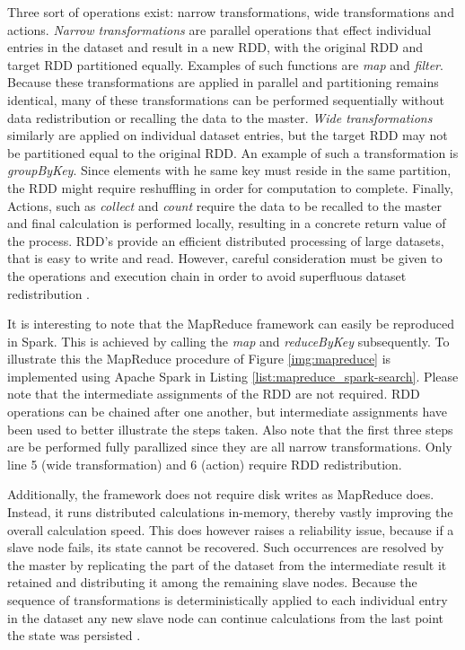 Three sort of operations exist: narrow transformations, wide transformations and actions. \emph{Narrow transformations} are parallel operations that effect individual entries in the dataset and result in a new RDD, with the original RDD and target RDD partitioned equally. Examples of such functions are \emph{map} and \emph{filter}. Because these transformations are applied in parallel and partitioning remains identical, many of these transformations can be performed sequentially without data redistribution or recalling the data to the master. \emph{Wide transformations} similarly are applied on individual dataset entries, but the target RDD may not be partitioned equal to the original RDD. An example of such a transformation is \emph{groupByKey}. Since elements with  he same key must reside in the same partition, the RDD might require reshuffling in order for computation to complete. Finally, Actions, such as \emph{collect} and \emph{count} require the data to be recalled to the master and final calculation is performed locally, resulting in a concrete return value of the process. RDD's provide an efficient distributed processing of large datasets, that is easy to write and read. However, careful consideration must be given to the operations and execution chain in order to avoid superfluous dataset redistribution \cite{spark_programming_guide}.



It is interesting to note that the MapReduce framework can easily be reproduced in Spark. This is achieved by calling the \emph{map} and \emph{reduceByKey} subsequently. To illustrate this the MapReduce procedure of Figure \ref{img:mapreduce} is implemented using Apache Spark in Listing \ref{list:mapreduce_spark-search}. Please note that the intermediate assignments of the RDD are not required. RDD operations can be chained after one another, but intermediate assignments have been used to better illustrate the steps taken. Also note that the first three steps are be performed fully parallized since they are all narrow transformations. Only line 5 (wide transformation) and 6 (action) require RDD redistribution.

Additionally, the framework does not require disk writes as MapReduce does. Instead, it runs distributed calculations in-memory, thereby vastly improving the overall calculation speed. This does however raises a reliability issue, because if a slave node fails, its state cannot be recovered. Such occurrences are resolved by the master by replicating the part of the dataset from the intermediate result it retained and distributing it among the remaining slave nodes. Because the sequence of transformations is deterministically applied to each individual entry in the dataset any new slave node can continue calculations from the last point the state was persisted \cite{rdd_fault_tolerance}.

